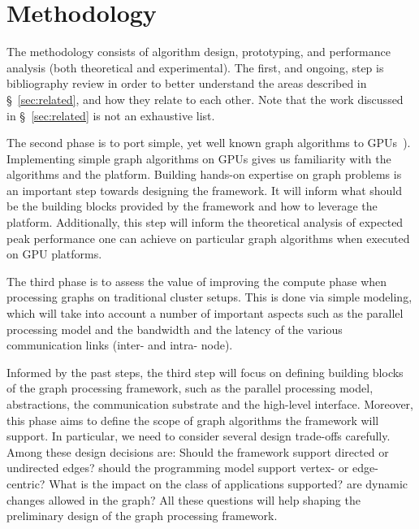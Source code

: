 \section{Methodology}
\label{sec:methodology}
The methodology consists of algorithm design, prototyping, and performance analysis (both theoretical and experimental).
The first, and ongoing, step is bibliography review in order to better understand the areas described in \S~\ref{sec:related}, and how they relate to each other. Note that the work discussed in \S~\ref{sec:related} is not an exhaustive list.

The second phase is to port simple, yet well known graph algorithms to GPUs~\cite{Quinn1984,Meyer2003,Harish2007,Malewicz2009,Sungpack2010}). Implementing simple graph algorithms on GPUs gives us familiarity with the algorithms and the platform. Building hands-on expertise on graph problems is an important step towards designing the framework. It will inform what should be the building blocks provided by the framework and how to leverage the platform. Additionally, this step will inform the theoretical analysis of expected peak performance one can achieve on particular graph algorithms when executed on GPU platforms.

The third phase is to assess the value of improving the compute phase when processing graphs on traditional cluster setups. This is done via simple modeling, which will take into account a number of important aspects such as the parallel processing model and the bandwidth and the latency of the various communication links (inter- and intra- node).

Informed by the past steps, the third step will focus on defining building blocks of the graph processing framework, such as the parallel processing model, abstractions, the communication substrate and the high-level interface. Moreover, this phase aims to define the scope of graph algorithms the framework will support. In particular, we need to consider several design trade-offs carefully. Among these design decisions are: Should the framework support directed or undirected edges? should the programming model support vertex- or edge-centric? What is the impact on the class of applications supported? are dynamic changes allowed in the graph? All these questions will help shaping the preliminary design of the graph processing framework.
